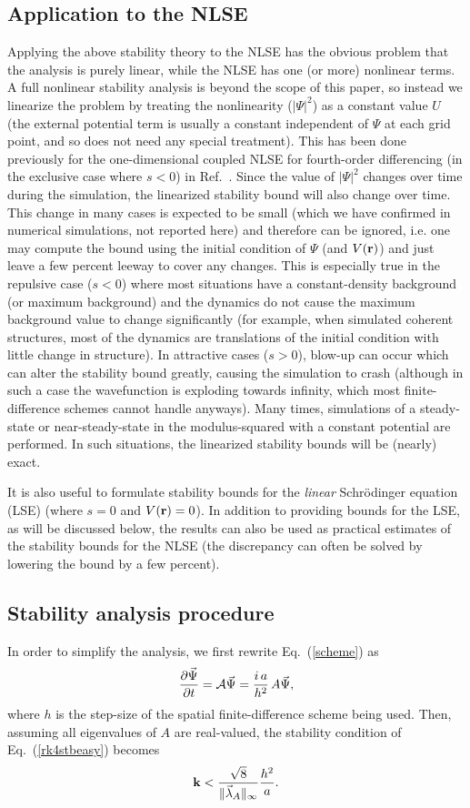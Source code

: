 \documentclass{article}
\begin{document}
\subsection{Application to the NLSE}
Applying the above stability theory to the NLSE has the obvious problem that the analysis is purely linear, while the NLSE has one (or more) nonlinear terms.  A full nonlinear stability analysis is beyond the scope of this paper, so instead we linearize the problem by treating the nonlinearity ($|\Psi|^2$) as a constant value $U$ (the external potential term is usually a constant independent of $\Psi$ at each grid point, and so does not need any special treatment).  This has been done previously for the one-dimensional coupled NLSE for fourth-order differencing (in the exclusive case where $s<0$) in Ref.~\cite{RK4_2CNLSE_STB}.  Since the value of $|\Psi|^2$ changes over time during the simulation, the linearized stability bound will also change over time.  This change in many cases is expected to be small (which we have confirmed in numerical simulations, not reported here) and therefore can be ignored, i.e. one may compute the bound using the initial condition of $\Psi$ (and $V(\bf{r})$) and just leave a few percent leeway to cover any changes.  This is especially true in the repulsive case ($s<0$) where most situations have a constant-density background (or maximum background) and the dynamics do not cause the maximum background value to change significantly (for example, when simulated coherent structures, most of the dynamics are translations of the initial condition with little change in structure).  In attractive cases ($s>0$), blow-up can occur which can alter the stability bound greatly, causing the simulation to crash (although in such a case the wavefunction is exploding towards infinity, which most finite-difference schemes cannot handle anyways). Many times, simulations of a steady-state or near-steady-state in the modulus-squared with a constant potential are performed.  In such situations, the linearized stability bounds will be (nearly) exact. 

It is also useful to formulate stability bounds for the \emph{linear} Schr{\"o}dinger equation (LSE) (where $s=0$ and $V({\bf r})=0$).  In addition to providing bounds for the LSE, as will be discussed below, the results can also be used as practical estimates of the stability bounds for the NLSE (the discrepancy can often be solved by lowering the bound by a few percent).

\subsection{Stability analysis procedure}
In order to simplify the analysis, we first rewrite Eq.~(\ref{scheme}) as
\[
\frac{\partial \vec \Psi}{\partial t} = {\cal A} \vec \Psi = \frac{i\,a}{h^2}\,A \vec \Psi,
\]
where $h$ is the step-size of the spatial finite-difference scheme being used.  Then, assuming all eigenvalues of $A$ are real-valued, the stability condition of Eq.~(\ref{rk4stbeasy}) becomes
\begin{equation}
\label{rk4stbeasy2}
{\bf k} < \frac{\sqrt{8}}{\lVert\vec \lambda_{A}\rVert_\infty}\frac{h^2}{a}.
\end{equation}
\end{document}
